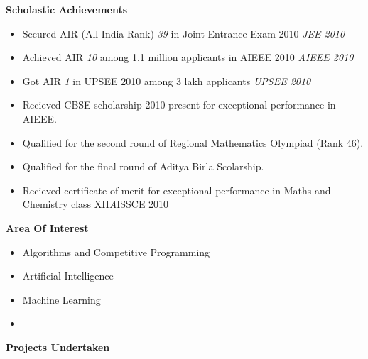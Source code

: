 \documentclass[11pt]{article}
\begin{document}
{\bf Scholastic Achievements}
{
\begin{itemize}
\item Secured AIR (All India Rank) \emph{39} in Joint Entrance Exam 2010 \hfill  \emph {JEE 2010}
\item Achieved AIR \emph{10} among 1.1 million applicants in AIEEE 2010 \hfill \emph{AIEEE 2010}
\item Got AIR \emph{1} in UPSEE 2010 among 3 lakh applicants \hfill \emph{UPSEE 2010}
\item Recieved CBSE scholarship 2010-present for exceptional performance in AIEEE.
\item Qualified for the second round of Regional Mathematics Olympiad (Rank 46).
\item Qualified for the final round of Aditya Birla Scolarship.
\item Recieved certificate of merit for exceptional performance in Maths and Chemistry class XII\hfill \emph AISSCE 2010\\
\end{itemize}
{\bf Area Of Interest}
\begin{itemize}
	\item Algorithms and Competitive Programming
	\item Artificial Intelligence
        \item Machine Learning
        \item 
\end{itemize}
}
{\bf Projects Undertaken}
\end{document}
